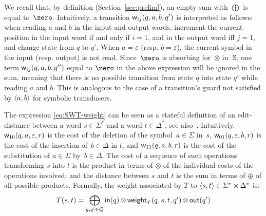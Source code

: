 %
We recall that, by definition (Section~\ref{sec:prelim}),
an empty sum with $\bigoplus$ is equal to~$\zero$.
%
Intuitively,  a transition $\mathsf{w}_{ij}(q, a, b, q')$ is interpreted as follows:
when reading $a$ and $b$ in the input and output words,
increment the current position in the input word if and only if $i = 1$,
and in the output word iff $j = 1$, %
and change state from $q$ to $q'$.
When $a = \varepsilon$ (resp. $b = \varepsilon$), the current symbol
in the input (resp. output) is not read.
%
%
Since~$\zero$ is absorbing for~$\otimes$ in~$\mathbb{S}$,
one term $\mathsf{w}_{ij}(q, a, b, q'')$ equal to $\zero$ in the above expression
will be ignored in the sum, meaning that there is no possible transition
from state $q$ into state $q'$ while reading $a$ and $b$.
This is analogous to the case of a transition's guard not satisfied by $\<a, b>$ for
symbolic transducers.

%

The expression \eqref{eq:SWT-weight}
can be seen as a stateful definition of
an edit-distance between a word $s \in \Sigma^*$ and a word $t \in \Delta^*$,
see also~\cite{Mohri03ijfcs}.
Intuitively,
$\mathsf{w}_{10}(q, a, \varepsilon, r)$ is the cost of
the deletion of the symbol~$a \in \Sigma$ in~$s$,
$\mathsf{w}_{01}(q, \varepsilon, b, r)$ is the cost
of the insertion of~$b \in \Delta$ in $t$,
and $\mathsf{w}_{11}(q, a, b, r)$ is the cost
of the substitution of  $a \in \Sigma$ by~$b \in \Delta$.
%
The cost of a sequence of such operations transforming $s$ into $t$
is the product in terms of $\otimes$ of the individual costs of the operations involved;
and the distance between $s$ and $t$ is the sum in terms of $\oplus$
of all possible products.
%
\medskip\noindent
Formally, the weight associated by $T$ to $\< s, t> \in \Sigma^* \times \Delta^*$ is:
\begin{equation}
T(s, t)  =
\displaystyle\bigoplus_{q, q' \in Q} \mathsf{in}(q)
\mathop{\otimes} \mathsf{weight}_T(q, s, t, q') \mathop{\otimes} \mathsf{out}(q')
\label{eq:SWT-value}
\end{equation}

